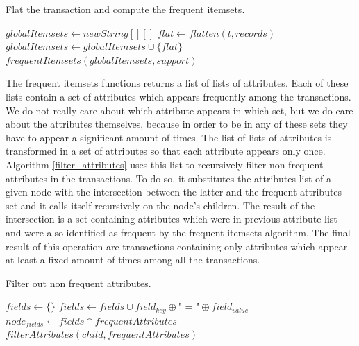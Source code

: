 \documentclass{acm_proc_article-sp-sigmod09}
\begin{document}
\begin{algorithm}
\caption{Flat the transaction and compute the frequent itemsets.}
\label{freqitemset}
\begin{algorithmic}[1]
\State $globalItemsets \gets new String[][]$
	\State $flat \gets flatten(t, records)$
	\State $globalItemsets \gets globalItemsets \cup \{flat\}$
\EndFor
\Return $frequentItemsets(globalItemsets, support)$
\EndFunction
\end{algorithmic}
\end{algorithm}

The frequent itemsets functions returns a list of lists of attributes. Each of these lists contain a set of attributes which appears frequently among the transactions. We do not really care about which attribute appears in which set, but we do care about the attributes themselves, because in order to be in any of these sets they have to appear a significant amount of times. The list of lists of attributes is transformed in a set of attributes so that each attribute appears only once. Algorithm \ref{filter_attributes} uses this list to recursively filter non frequent attributes in the transactions. To do so, it substitutes the attributes list of a given node with the intersection between the latter and the frequent attributes set and it calls itself recursively on the node's children. The result of the intersection is a set containing attributes which were in previous attribute list and were also identified as frequent by the frequent itemsets algorithm. The final result of this operation are transactions containing only attributes which appear at least a fixed amount of times among all the transactions.

\begin{algorithm}
\caption{Filter out non frequent attributes.}
\label{filter_attributes}
\begin{algorithmic}[1]
\State $fields \gets \{\}$
    \State $fields \gets fields \cup field_{key} \oplus \text{" = "} \oplus field_{value}$
\EndFor
\State $node_{fields} \gets fields \cap frequentAttributes$
    \State $filterAttributes(child, frequentAttributes)$
\EndFor
\EndFunction
\end{algorithmic}
\end{algorithm}
\end{document}
